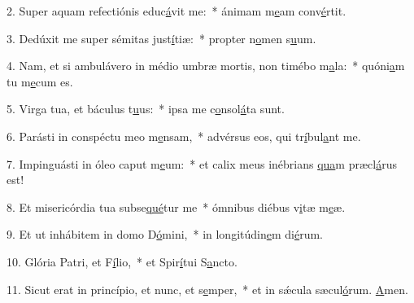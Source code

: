 2. Super aquam refectiónis educ\uline{á}vit me:~* ánimam m\uline{e}am conv\uline{é}rtit.\par 
3. Dedúxit me super sémitas just\uline{í}tiæ:~* propter n\uline{o}men s\uline{u}um.\par 
4. Nam, et si ambulávero in médio umbræ mortis, non timébo m\uline{a}la:~* quóni\uline{a}m tu m\uline{e}cum es.\par 
5. Virga tua, et báculus t\uline{u}us:~* ipsa me c\uline{o}nsol\uline{á}ta sunt.\par 
6. Parásti in conspéctu meo m\uline{e}nsam,~* advérsus eos, qui tr\uline{í}bul\uline{a}nt me.\par 
7. Impinguásti in óleo caput m\uline{e}um:~* et calix meus inébrians \uline{qua}m præcl\uline{á}rus est!\par 
8. Et misericórdia tua subse\uline{qué}tur me~* ómnibus diébus v\uline{i}tæ m\uline{e}æ.\par 
9. Et ut inhábitem in domo D\uline{ó}mini,~* in longitúdin\uline{e}m di\uline{é}rum.\par 
10. Glória Patri, et F\uline{í}lio,~* et Spir\uline{í}tui S\uline{a}ncto.\par 
11. Sicut erat in princípio, et nunc, et s\uline{e}mper,~* et in sǽcula sæcul\uline{ó}rum. \uline{A}men.\par 
